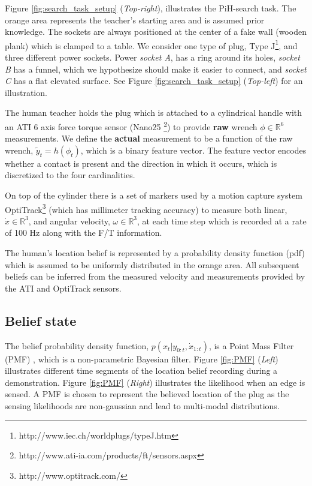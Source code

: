 \documentclass[final,5p,times,twocolumn]{elsarticle}
\begin{document}
Figure \ref{fig:search_task_setup} (\textit{Top-right}), illustrates the PiH-search task. The orange area represents 
the teacher's starting area and is assumed prior knowledge. The sockets are always positioned at the center of a fake 
wall (wooden plank) which is clamped to a table. We consider one type of plug, 
Type J\footnote{http://www.iec.ch/worldplugs/typeJ.htm}, and three different power sockets. 
Power \textit{socket A}, has a ring around its holes, \textit{socket B} has a funnel, which we hypothesize should make 
it easier to connect, and \textit{socket C} has a flat elevated surface. See Figure \ref{fig:search_task_setup}
(\textit{Top-left}) for an illustration. 

The human teacher holds the plug which is attached to a cylindrical handle with 
an ATI 6 axis force torque sensor (Nano25 \footnote{http://www.ati-ia.com/products/ft/sensors.aspx}) 
to provide \textbf{raw} wrench $\phi \in \mathbb{R}^6$ measurements. We define the \textbf{actual} measurement 
to be a function of the raw wrench, $\tilde{y}_t = h(\phi_t)$, which is a binary feature vector. The feature vector encodes whether a contact is present 
and the direction in which it occurs, which is discretized to the four cardinalities.

On top of the cylinder there is a set of markers used by a motion capture system 
OptiTrack\footnote{http://www.optitrack.com/} (which has millimeter tracking accuracy) to measure 
both linear, $\dot{x} \in \mathbb{R}^3$, and angular velocity, $\omega \in \mathbb{R}^3$, at each 
time step which is recorded at a rate of 100 Hz along with the F/T information.

The human's location belief is represented by a probability density function (pdf) which 
is assumed to be uniformly distributed in the orange area. All subsequent beliefs can 
be inferred from the measured velocity and measurements provided by the ATI and OptiTrack sensors.

\subsection{Belief state}

The belief probability density function,  $p(x_t|y_{0:t},\dot{x}_{1:t})$, is a Point Mass Filter (PMF) 
\cite[p.87]{Bergman99recursivebayesian}, which is a non-parametric  Bayesian filter.
Figure \ref{fig:PMF} (\textit{Left}) illustrates different time segments of the location belief recording
during a demonstration. Figure \ref{fig:PMF} (\textit{Right}) illustrates the likelihood when an edge is sensed. 
A PMF is chosen to represent the believed location of the plug as the sensing likelihoods are non-gaussian and 
lead to multi-modal distributions. 
\end{document}
